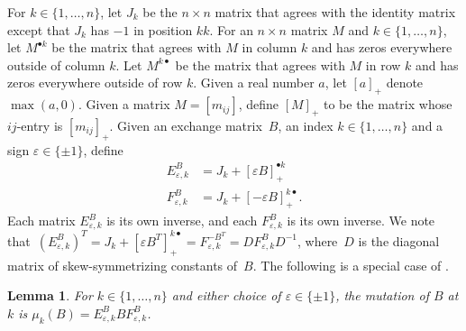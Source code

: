 \documentclass[10pt]{article}
\newtheorem{lemma}[proposition]{Lemma}
\theoremstyle{definition}
\theoremstyle{remark}
\numberwithin{equation}{section}
\newcommand{\ep}{\varepsilon}
\newcommand{\sgn}{\operatorname{sgn}}
\newcommand{\set}[1]{{\lbrace #1 \rbrace}}
\newcommand{\0}{{\mathbf{0}}}
\newcommand{\symmetrizer}{{D}}
\begin{document}
For $k\in\set{1,\ldots,n}$, let $J_k$ be the $n\times n$ matrix that agrees with the identity matrix except that $J_k$ has $-1$ in position $kk$.
For an $n\times n$ matrix $M$ and $k\in\set{1,\ldots,n}$, let $M^{\bullet k}$ be the matrix that agrees with $M$ in column $k$ and has zeros everywhere outside of column $k$.
Let $M^{k\bullet}$ be the matrix that agrees with $M$ in row $k$ and has zeros everywhere outside of row $k$.
Given a real number $a$, let $[a]_+$ denote $\max(a,0)$.
Given a matrix $M=[m_{ij}]$, define $[M]_+$ to be the matrix whose $ij$-entry is $[m_{ij}]_+$.
Given an exchange matrix~$B$, an index $k\in\set{1,\ldots,n}$ and a sign $\ep\in\set{\pm1}$, define
\begin{align*}
E_{\ep,k}^B&=J_k+[\ep B]_+^{\bullet k}\\
F_{\ep,k}^B&=J_k+[-\ep B]_+^{k\bullet}.
\end{align*}
Each matrix $E_{\ep,k}^B$ is its own inverse, and each $F_{\ep,k}^B$ is its own inverse.
We note that~$(E_{\ep,k}^B)^T=J_k+[\ep B^T]_+^{k\bullet}=F_{\ep,k}^{-B^T}=\symmetrizer F_{\ep,k}^B\symmetrizer^{-1}$, where~$\symmetrizer$ is the diagonal matrix of skew-symmetrizing constants of~$B$.
The following is a special case of \cite[(3.2)]{ca3}.
\begin{lemma}\label{EBF trick}
For $k\in\set{1,\ldots,n}$ and either choice of $\ep\in\set{\pm1}$, the mutation of $B$ at $k$ is $\mu_k(B)=E_{\ep,k}^BBF_{\ep,k}^B$.
\end{lemma}
\end{document}
